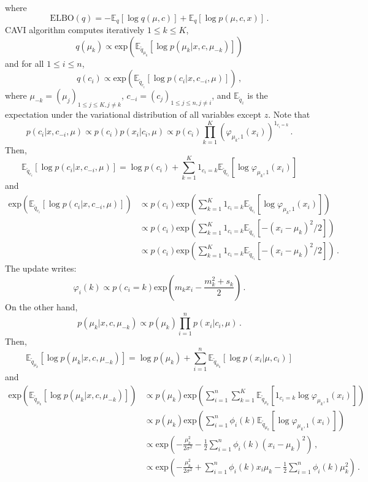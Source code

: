 \documentclass[english,graybox,envcountchap,envcountsame,sectrefs,shortlabels]{svmono}
\theoremstyle{style}
\begin{document}
where
$$
\mathrm{ELBO}(q) = -\mathbb{E}_q[\log q(\mu,c)] + \mathbb{E}_q[\log p(\mu,c,x)] \,.
$$
CAVI algorithm computes iteratively $1\leqslant k \leqslant K$,
$$
q(\mu_k) \propto \mathrm{exp}\left(\mathbb{E}_{\tilde q_{\mu_k}}[\log p(\mu_k|x,c,\mu_{-k})]\right)
$$
and for all $1\leqslant i \leqslant n$,
$$
q(c_i) \propto \mathrm{exp}\left(\mathbb{E}_{\tilde q_{c_i}}[\log p(c_i|x,c_{-i},\mu)]\right)\,,
$$
where $\mu_{-k} = (\mu_j)_{1\leq j \leq K, j\neq k}$, $c_{-i} = (c_j)_{1\leq j \leq n, j\neq i}$, and  $\mathbb{E}_{\tilde q_z}$ is the expectation under the variational distribution of all variables except $z$. 
Note that
$$
p(c_i|x,c_{-i},\mu) \propto p(c_i)p(x_i|c_i,\mu) \propto p(c_i)\prod_{k=1}^K \left(\varphi_{\mu_k,1}(x_i)\right)^{1_{c_i=k}}\,. 
$$
Then,
$$
\mathbb{E}_{\tilde q_{c_i}}[\log p(c_i|x,c_{-i},\mu)] = \log p(c_i) + \sum_{k=1}^K 1_{c_i=k} \mathbb{E}_{\tilde q_{c_i}}[\log \varphi_{\mu_k,1}(x_i)]
$$
and
\begin{align*}
\mathrm{exp}\left(\mathbb{E}_{\tilde q_{c_i}}[\log p(c_i|x,c_{-i},\mu)]\right) &\propto p(c_i) \mathrm{exp}\left(\sum_{k=1}^K 1_{c_i=k} \mathbb{E}_{\tilde q_{c_i}}[\log \varphi_{\mu_k,1}(x_i)]\right)\,\\
&\propto p(c_i) \mathrm{exp}\left(\sum_{k=1}^K 1_{c_i=k} \mathbb{E}_{\tilde q_{c_i}}[-(x_i-\mu_k)^2/2]\right)\,\\
&\propto p(c_i) \mathrm{exp}\left(\sum_{k=1}^K 1_{c_i=k} \mathbb{E}_{\tilde q_{c_i}}[-(x_i-\mu_k)^2/2]\right)\,.
\end{align*}
The update writes:
$$
\varphi_i(k) \propto p(c_i=k) \mathrm{exp}\left(m_k x_i - \frac{m^2_k + s_k}{2}\right)\,.
$$
On the other hand,
$$
p(\mu_k|x,c,\mu_{-k}) \propto p(\mu_k)\prod_{i=1}^np(x_i|c_i,\mu) \,. 
$$
Then,
$$
\mathbb{E}_{\tilde q_{\mu_k}}[\log p(\mu_k|x,c,\mu_{-k})] = \log p(\mu_k) + \sum_{i=1}^n \mathbb{E}_{\tilde q_{\mu_k}}[\log p(x_i|\mu,c_i)]
$$
and
\begin{align*}
\mathrm{exp}\left(\mathbb{E}_{\tilde q_{\mu_k}}[\log p(\mu_k|x,c,\mu_{-k})]\right) &\propto p(\mu_k) \mathrm{exp}\left(\sum_{i=1}^n\sum_{k=1}^K  \mathbb{E}_{\tilde q_{\mu_k}}[1_{c_i=k}\log \varphi_{\mu_k,1}(x_i)]\right)\,\\
&\propto p(\mu_k) \mathrm{exp}\left(\sum_{i=1}^n \phi_i(k) \mathbb{E}_{\tilde q_{\mu_k}}[\log \varphi_{\mu_k,1}(x_i)]\right)\,\\
&\propto \mathrm{exp}\left(-\frac{\mu_k^2}{2\sigma^2}-\frac{1}{2}\sum_{i=1}^n \phi_i(k)(x_i-\mu_k)^2\right)\,,\\
&\propto \mathrm{exp}\left(-\frac{\mu_k^2}{2\sigma^2}+\sum_{i=1}^n \phi_i(k)x_i\mu_k - \frac{1}{2}\sum_{i=1}^n \phi_i(k)\mu^2_k\right)\,.
\end{align*}
\end{document}
